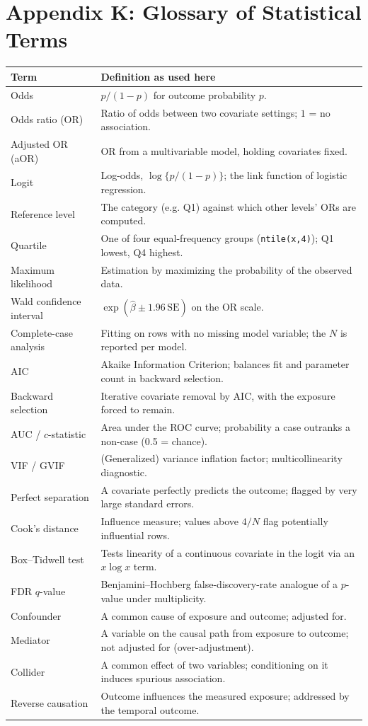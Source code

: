 \documentclass[11pt]{article}
\newcommand{\code}[1]{\texttt{\small #1}}
\begin{document}
\section{Appendix K: Glossary of Statistical Terms}
\begin{longtable}{@{}p{4.4cm}p{9.1cm}@{}}
\toprule
\textbf{Term} & \textbf{Definition as used here} \\
\midrule
\endhead
Odds & $p/(1-p)$ for outcome probability $p$. \\
Odds ratio (OR) & Ratio of odds between two covariate settings; $1$ = no association. \\
Adjusted OR (aOR) & OR from a multivariable model, holding covariates fixed. \\
Logit & Log-odds, $\log\{p/(1-p)\}$; the link function of logistic regression. \\
Reference level & The category (e.g. Q1) against which other levels' ORs are computed. \\
Quartile & One of four equal-frequency groups (\code{ntile(x,4)}); Q1 lowest, Q4 highest. \\
Maximum likelihood & Estimation by maximizing the probability of the observed data. \\
Wald confidence interval & $\exp(\hat\beta \pm 1.96\,\mathrm{SE})$ on the OR scale. \\
Complete-case analysis & Fitting on rows with no missing model variable; the $N$ is reported per model. \\
AIC & Akaike Information Criterion; balances fit and parameter count in backward selection. \\
Backward selection & Iterative covariate removal by AIC, with the exposure forced to remain. \\
AUC / $c$-statistic & Area under the ROC curve; probability a case outranks a non-case (0.5 = chance). \\
VIF / GVIF & (Generalized) variance inflation factor; multicollinearity diagnostic. \\
Perfect separation & A covariate perfectly predicts the outcome; flagged by very large standard errors. \\
Cook's distance & Influence measure; values above $4/N$ flag potentially influential rows. \\
Box--Tidwell test & Tests linearity of a continuous covariate in the logit via an $x\log x$ term. \\
FDR $q$-value & Benjamini--Hochberg false-discovery-rate analogue of a $p$-value under multiplicity. \\
Confounder & A common cause of exposure and outcome; adjusted for. \\
Mediator & A variable on the causal path from exposure to outcome; not adjusted for (over-adjustment). \\
Collider & A common effect of two variables; conditioning on it induces spurious association. \\
Reverse causation & Outcome influences the measured exposure; addressed by the temporal outcome. \\
\bottomrule
\end{longtable}
\end{document}
